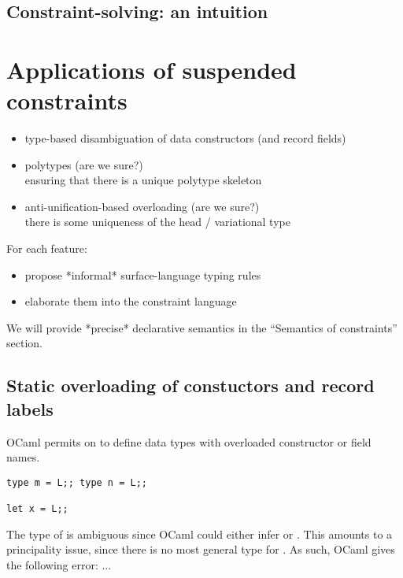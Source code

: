 \documentclass[acmsmall,screen,nonacm]{acmart}
\begin{document}
\subsection{Constraint-solving: an intuition}


\section{Applications of suspended constraints}

\begin{itemize}
\item
  type-based disambiguation of data constructors (and record fields)
\item
  polytypes (are we sure?) \\ ensuring that there is a unique polytype
  skeleton
\item
  anti-unification-based overloading (are we sure?) \\ there is some
  uniqueness of the head / variational type
\end{itemize}


For each feature:
\begin{itemize}
\item propose *informal* surface-language typing rules
\item elaborate them into the constraint language
\end{itemize}

We will provide *precise* declarative semantics in the ``Semantics of
constraints'' section.

\subsection{Static overloading of constuctors and record labels}

OCaml permits on to define data types with overloaded constructor or field
names.
\begin{lstlisting}
type m = L;; type n = L;;

let x = L;;
\end{lstlisting}
The type of  is ambiguous since OCaml could either infer  or
. This amounts to a principality issue, since there is no most
general type for . As such, OCaml gives the following error: ...
\end{document}
